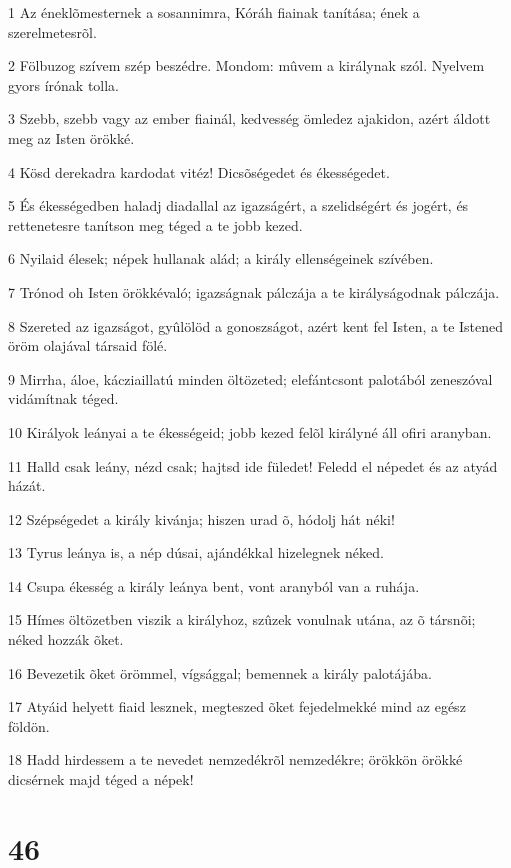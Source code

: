 \par 1 Az éneklõmesternek a sosannimra, Kóráh fiainak tanítása; ének a szerelmetesrõl.
\par 2 Fölbuzog szívem szép beszédre. Mondom: mûvem a királynak szól. Nyelvem gyors írónak tolla.
\par 3 Szebb, szebb vagy az ember fiainál, kedvesség ömledez ajakidon, azért áldott meg az Isten örökké.
\par 4 Kösd derekadra kardodat vitéz! Dicsõségedet és ékességedet.
\par 5 És ékességedben haladj diadallal az igazságért, a szelidségért és jogért, és rettenetesre tanítson meg téged a te jobb kezed.
\par 6 Nyilaid élesek; népek hullanak alád; a király ellenségeinek szívében.
\par 7 Trónod oh Isten örökkévaló; igazságnak pálczája a te királyságodnak pálczája.
\par 8 Szereted az igazságot, gyûlölöd a gonoszságot, azért kent fel Isten, a te Istened öröm olajával társaid fölé.
\par 9 Mirrha, áloe, kácziaillatú minden öltözeted; elefántcsont palotából zeneszóval vidámítnak téged.
\par 10 Királyok leányai a te ékességeid; jobb kezed felõl királyné áll ofiri aranyban.
\par 11 Halld csak leány, nézd csak; hajtsd ide füledet! Feledd el népedet és az atyád házát.
\par 12 Szépségedet a király kivánja; hiszen urad õ, hódolj hát néki!
\par 13 Tyrus leánya is, a nép dúsai, ajándékkal hizelegnek néked.
\par 14 Csupa ékesség a király leánya bent, vont aranyból van a ruhája.
\par 15 Hímes öltözetben viszik a királyhoz, szûzek vonulnak utána, az õ társnõi; néked hozzák õket.
\par 16 Bevezetik õket örömmel, vígsággal; bemennek a király palotájába.
\par 17 Atyáid helyett fiaid lesznek, megteszed õket fejedelmekké mind az egész földön.
\par 18 Hadd hirdessem a te nevedet nemzedékrõl nemzedékre; örökkön örökké dicsérnek majd téged a népek!

\chapter{46}

